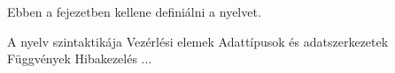 
Ebben a fejezetben kellene definiálni a nyelvet.

A nyelv szintaktikája
Vezérlési elemek
Adattípusok és adatszerkezetek
Függvények
Hibakezelés
...
